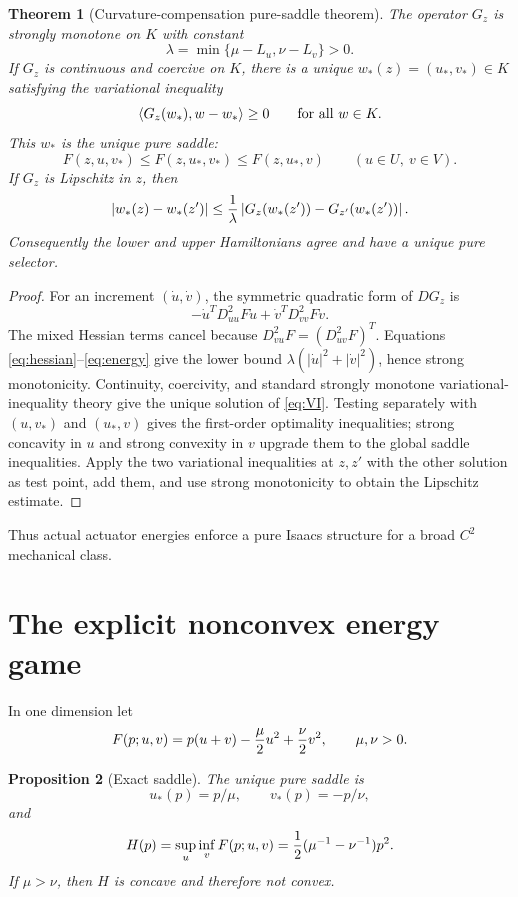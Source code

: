 \documentclass[11pt,reqno]{amsart}
\newtheorem{theorem}{Theorem}[section]
\newtheorem{proposition}[theorem]{Proposition}
\theoremstyle{definition}
\theoremstyle{remark}
\newcommand{\abs}[1]{\left\lvert #1\right\rvert}
\newcommand{\inner}[2]{\left\langle #1,#2\right\rangle}
\begin{document}
\begin{theorem}[Curvature-compensation pure-saddle theorem]\label{thm:VI}
The operator $G_z$ is strongly monotone on $K$ with constant
\[
 \lambda=\min\{\mu-L_u,\nu-L_v\}>0.
\]
If $G_z$ is continuous and coercive on $K$, there is a unique
$w_*(z)=(u_*,v_*)\in K$ satisfying the variational inequality
\begin{equation}\label{eq:VI}
 \inner{G_z(w_*)}{w-w_*}\ge0
 \qquad\hbox{for all }w\in K.
\end{equation}
This $w_*$ is the unique pure saddle:
\[
 F(z,u,v_*)\le F(z,u_*,v_*)\le F(z,u_*,v)
 \qquad(u\in U,\ v\in V).
\]
If $G_z$ is Lipschitz in $z$, then
\[
 \abs{w_*(z)-w_*(z')}
 \le {1\over\lambda}
 \abs{G_z(w_*(z'))-G_{z'}(w_*(z'))}.
\]
Consequently the lower and upper Hamiltonians agree and have a unique pure
selector.
\end{theorem}

\begin{proof}
For an increment $(\dot u,\dot v)$, the symmetric quadratic form of $DG_z$ is
\[
 -\dot u^TD_{uu}^2F\dot u+
 \dot v^TD_{vv}^2F\dot v.
\]
The mixed Hessian terms cancel because
$D_{vu}^2F=(D_{uv}^2F)^T$.  Equations
\eqref{eq:hessian}--\eqref{eq:energy} give the lower bound
$\lambda(\abs{\dot u}^2+\abs{\dot v}^2)$, hence strong monotonicity.
Continuity, coercivity, and standard strongly monotone variational-inequality
theory give the unique solution of \eqref{eq:VI}.  Testing separately with
$(u,v_*)$ and $(u_*,v)$ gives the first-order optimality inequalities; strong
concavity in $u$ and strong convexity in $v$ upgrade them to the global saddle
inequalities.  Apply the two variational inequalities at $z,z'$ with the other
solution as test point, add them, and use strong monotonicity to obtain the
Lipschitz estimate.
\end{proof}

Thus actual actuator energies enforce a pure Isaacs structure for a broad
$C^2$ mechanical class.

\section{The explicit nonconvex energy game}\label{sec:quadratic}
In one dimension let
\begin{equation}\label{eq:localgame}
 F(p;u,v)=p(u+v)-{\mu\over2}u^2+{\nu\over2}v^2,
 \qquad \mu,\nu>0.
\end{equation}

\begin{proposition}[Exact saddle]\label{prop:saddle}
The unique pure saddle is
\[
 u_*(p)=p/\mu,
 \qquad v_*(p)=-p/\nu,
\]
and
\begin{equation}\label{eq:H}
 H(p)=\sup_u\inf_vF(p;u,v)
 ={1\over2}(\mu^{-1}-\nu^{-1})p^2.
\end{equation}
If $\mu>\nu$, then $H$ is concave and therefore not convex.
\end{proposition}
\end{document}
